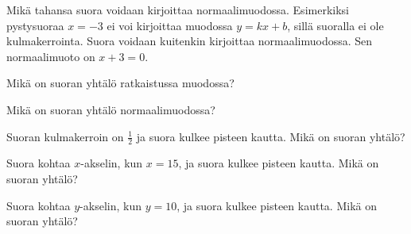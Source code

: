 Mikä tahansa suora voidaan kirjoittaa normaalimuodossa. Esimerkiksi pystysuoraa $x=-3$ ei voi kirjoittaa muodossa $y=kx+b$, sillä suoralla ei ole kulmakerrointa. Suora voidaan kuitenkin kirjoittaa normaalimuodossa. Sen normaalimuoto on $x+3=0$.

\begin{tehtavasivu}

\sarjaA %

\begin{tehtava}
Mikä on suoran yhtälö ratkaistussa muodossa?
\begin{vastaus}
\end{vastaus}
\end{tehtava}

\begin{tehtava}
Mikä on suoran yhtälö normaalimuodossa?
\begin{vastaus}
\end{vastaus}
\end{tehtava}

\begin{tehtava}
Suoran kulmakerroin on $\frac{1}{2}$ ja suora kulkee pisteen
kautta. Mikä on suoran yhtälö?
\begin{vastaus}
\end{vastaus}
\end{tehtava}

\begin{tehtava}
Suora kohtaa $x$-akselin, kun $x=15$, ja suora kulkee pisteen
kautta. Mikä on suoran yhtälö?
\begin{vastaus}
\end{vastaus}
\end{tehtava}

\begin{tehtava}
Suora kohtaa $y$-akselin, kun $y=10$, ja suora kulkee pisteen
kautta. Mikä on suoran yhtälö?
\begin{vastaus}
\end{vastaus}
\end{tehtava}


\end{tehtavasivu}
